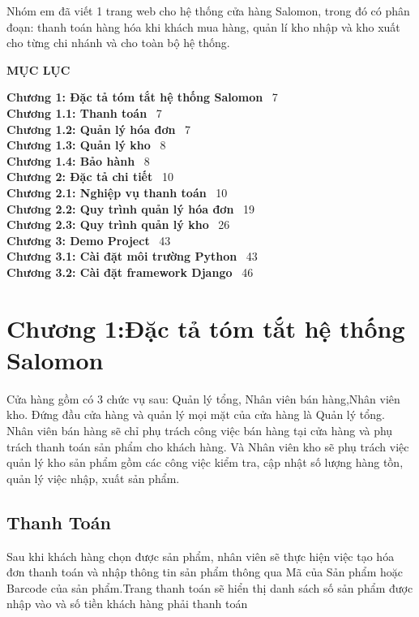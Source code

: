 \documentclass{article}
\begin{document}
Nhóm em đã viết 1 trang web cho hệ thống cửa hàng Salomon, trong đó có phân đoạn: thanh toán hàng hóa khi khách mua hàng, quản lí kho nhập và kho xuất cho từng chi nhánh và cho toàn bộ hệ thống.
\pagebreak
\begin{center}
    \fontsize{16}{20}\selectfont
    \textbf{MỤC LỤC}
\end{center}
\fontsize{13}{20}\selectfont
\fontsize{14}{20}\selectfont\textbf{Chương 1: Đặc tả tóm tắt hệ thống Salomon}\xfill{1pt} \ 7 \\
\fontsize{12}{20}\selectfont\textbf{Chương 1.1: Thanh toán}\xfill{1pt} \ 7 \\
\fontsize{12}{20}\selectfont\textbf{Chương 1.2: Quản lý hóa đơn}\xfill{1pt} \ 7 \\
\fontsize{12}{20}\selectfont\textbf{Chương 1.3: Quản lý kho}\xfill{1pt} \ 8 \\
\fontsize{12}{20}\selectfont\textbf{Chương 1.4: Bảo hành}\xfill{1pt} \ 8 \\[0.5cm]
\fontsize{14}{20}\selectfont\textbf{Chương 2: Đặc tả chi tiết}\xfill{1pt} \ 10 \\
\fontsize{12}{20}\selectfont\textbf{Chương 2.1: Nghiệp vụ thanh toán}\xfill{1pt} \ 10 \\
\fontsize{12}{20}\selectfont\textbf{Chương 2.2: Quy trình quản lý hóa đơn}\xfill{1pt} \ 19 \\
\fontsize{12}{20}\selectfont\textbf{Chương 2.3: Quy trình quản lý kho}\xfill{1pt} \ 26 \\[0.5cm]
\fontsize{12}{20}\selectfont\textbf{Chương 3: Demo Project}\xfill{1pt} \ 43 \\
\fontsize{12}{20}\selectfont\textbf{Chương 3.1: Cài đặt môi trường Python}\xfill{1pt} \ 43 \\
\fontsize{12}{20}\selectfont\textbf{Chương 3.2: Cài đặt framework Django}\xfill{1pt} \ 46 \\

\pagebreak

\fontsize{16}{20}\selectfont\section{Chương 1:Đặc tả tóm tắt hệ thống Salomon }
\fontsize{13}{20}\selectfont
Cửa hàng gồm có 3 chức vụ sau: Quản lý tổng, Nhân viên bán hàng,Nhân viên kho. Đứng đầu cửa hàng và quản lý mọi mặt của cửa hàng là Quản lý tổng. Nhân viên bán hàng sẽ chỉ phụ trách công việc bán hàng tại cửa hàng và phụ trách thanh toán sản phẩm cho khách hàng. Và Nhân viên kho sẽ phụ trách việc quản lý kho sản phẩm gồm các công việc kiểm tra, cập nhật số lượng hàng tồn, quản lý việc nhập, xuất sản phẩm.
\fontsize{14}{20}\selectfont\subsection{Thanh Toán}
\fontsize{13}{20}\selectfont
Sau khi khách hàng chọn được sản phẩm, nhân viên sẽ thực hiện việc tạo hóa đơn thanh toán và nhập thông tin sản phẩm thông qua Mã của Sản phẩm hoặc Barcode của sản phẩm.Trang thanh toán sẽ hiển thị danh sách số sản phẩm được nhập vào và số tiền khách hàng phải thanh toán
\end{document}
